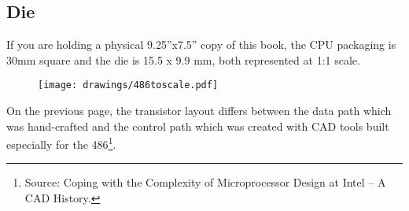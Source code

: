 \subsection{Die}
If you are holding a physical 9.25''x7.5'' copy of this book, the CPU packaging is 30mm square and the die is 15.5 x 9.9 mm, both represented at 1:1 scale.\\
\par
\bigskip

  \begin{figure}[!htb]

\begin{minipage}{0.48\textwidth}
\centering
{}
\end{minipage}
\hfill
\begin{minipage}{0.48\textwidth}
\centering
\texttt{[image: drawings/486toscale.pdf]}
\end{minipage}
\end{figure}

\par



\begin{figure}[H]
\centering
{}
\end{figure}
\par
\begin{figure}[H]
\centering
{}
\end{figure}





On the previous page, the transistor layout differs between the data path which was hand-crafted and the control path which was created with CAD tools built especially for the 486\footnote{Source: Coping with the Complexity of Microprocessor
Design at Intel -- A CAD History.}.\\
\par
